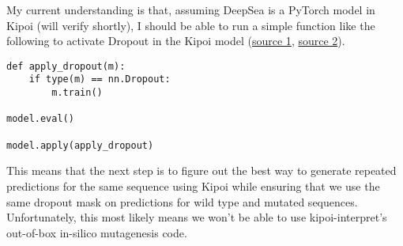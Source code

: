 \begin{Minutes}{}
\maketitle
{}
My current understanding is that, assuming DeepSea is a PyTorch model in Kipoi (will verify shortly), I should be able to run a simple function like the following to activate Dropout in the Kipoi model (\href{https://discuss.pytorch.org/t/dropout-at-test-time-in-densenet/6738}{source 1}, \href{https://discuss.pytorch.org/t/using-dropout-in-evaluation-mode/27721}{source 2}).

\begin{lstlisting}
def apply_dropout(m):
    if type(m) == nn.Dropout:
        m.train()

model.eval()

model.apply(apply_dropout)
\end{lstlisting}

This means that the next step is to figure out the best way to generate repeated predictions for the same sequence using Kipoi while ensuring that we use the same dropout mask on predictions for wild type and mutated sequences. Unfortunately, this most likely means we won't be able to use kipoi-interpret's out-of-box in-silico mutagenesis code.

\end{Minutes}
